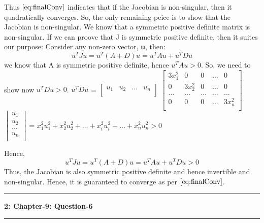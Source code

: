 \documentclass{article}
\newcommand\question[2]{\vspace{.25in}\hrule\textbf{#1: #2}\hrule\vspace{.10in}}
\begin{document}
  Thus $\eqref{eq:finalConv}$ indicates that if the Jacobian is non-singular, then it quadratically converges. So, the only remaining peice is to show that the Jacobian is non-singular. We know that a symmetric positive definite matrix is non-singular. If we can proove that J is symmetric positive definite, then it suites our purpose: Consider any non-zero vector, \textbf {u}, then:
  \[u^T J u = u^T (A + D) u = u^TAu + u^TDu\]
  we know that A is symmetric positive definite, hence $u^TAu > 0$. So, we need to show now $u^TDu > 0$. \newline
  $u^TDu$ = $\begin{bmatrix}
	       u_1 & u_2 & \dots & u_n \\
	    \end{bmatrix}$ $\begin{bmatrix}
		    		3x_1^2 & 0 & 0 & \dots & 0 \\
				0 & 3x_2^2 & 0 & \dots & 0 \\
				\dots & \dots & \dots & \dots & \dots \\
				0 & 0 & 0 & \dots & 3x_n^2 \\
			    \end{bmatrix}$ $\begin{bmatrix}
				    		u_1 \\
						u_2 \\
						\dots \\
						u_n \\
				    	   \end{bmatrix}$ = $x_1^2u_1^2 + x_2^2u_2^2 + \dots + x_i^2u_i^2 + \dots + x_n^2u_n^2 > 0$ \newline

  Hence,
  \[u^T J u = u^T (A + D) u = u^TAu + u^TDu > 0\]
  Thus, the Jacobian is also symmetric positive definite and hence invertible and non-singular. Hence, it is guaranteed to converge as per $\eqref{eq:finalConv}$. \newline


	  	  

 


\question{2}{Chapter-9: Question-6}
\end{document}
